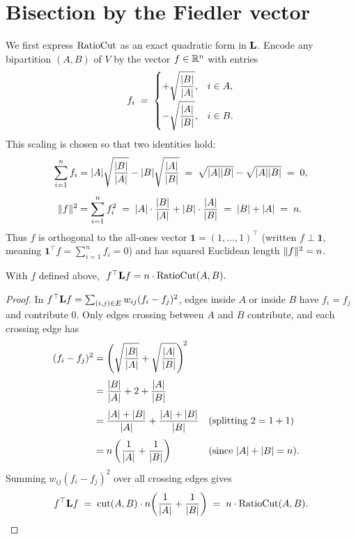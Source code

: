 \section{Bisection by the Fiedler vector}
\label{ch33:fiedler}

We first express $\operatorname{RatioCut}$ as an exact quadratic form in $\mathbf{L}$. Encode any bipartition $(A,B)$ of $V$ by the vector $f \in \mathbb{R}^n$ with entries
\[
  f_i \;=\;
  \begin{cases}
    +\sqrt{\dfrac{\lvert B\rvert}{\lvert A\rvert}}, & i\in A,\\[8pt]
    -\sqrt{\dfrac{\lvert A\rvert}{\lvert B\rvert}}, & i\in B.
  \end{cases}
\]
This scaling is chosen so that two identities hold:
\begin{align*}
  \sum_{i=1}^n f_i &= \lvert A\rvert\sqrt{\frac{\lvert B\rvert}{\lvert A\rvert}} - \lvert B\rvert\sqrt{\frac{\lvert A\rvert}{\lvert B\rvert}} \;=\; \sqrt{\lvert A\rvert\lvert B\rvert} - \sqrt{\lvert A\rvert\lvert B\rvert} \;=\; 0,\\[4pt]
  \lVert f\rVert^2 &= \sum_{i=1}^n f_i^2 \;=\; \lvert A\rvert\cdot\frac{\lvert B\rvert}{\lvert A\rvert} + \lvert B\rvert\cdot\frac{\lvert A\rvert}{\lvert B\rvert} \;=\; \lvert B\rvert + \lvert A\rvert \;=\; n.
\end{align*}
Thus $f$ is orthogonal to the all-ones vector $\mathbf{1} = (1,\dots,1)^\top$ (written $f \perp \mathbf{1}$, meaning $\mathbf{1}^\top f = \sum_{i=1}^n f_i = 0$) and has squared Euclidean length $\lVert f\rVert^2 = n$.

\begin{lemma}
\label{ch33:ratiocut-quad}
With $f$ defined above, $\; f^\top \mathbf{L} f = n\cdot\operatorname{RatioCut}(A,B).$
\end{lemma}

\begin{proof}
In $f^\top\mathbf{L} f=\sum_{(i,j)\in E}w_{ij}(f_i-f_j)^2$, edges inside $A$ or inside $B$ have $f_i = f_j$ and contribute $0$. Only edges crossing between $A$ and $B$ contribute, and each crossing edge has
\begin{align*}
  (f_i - f_j)^2
  &= \left(\sqrt{\frac{\lvert B\rvert}{\lvert A\rvert}} + \sqrt{\frac{\lvert A\rvert}{\lvert B\rvert}}\right)^{\!2}\\[3pt]
  &= \frac{\lvert B\rvert}{\lvert A\rvert} + 2 + \frac{\lvert A\rvert}{\lvert B\rvert}\\[3pt]
  &= \frac{\lvert A\rvert+\lvert B\rvert}{\lvert A\rvert} + \frac{\lvert A\rvert+\lvert B\rvert}{\lvert B\rvert} && \text{(splitting $2 = 1 + 1$)}\\[3pt]
  &= n\left(\frac{1}{\lvert A\rvert}+\frac{1}{\lvert B\rvert}\right) && \text{(since $\lvert A\rvert+\lvert B\rvert=n$).}
\end{align*}
Summing $w_{ij}(f_i - f_j)^2$ over all crossing edges gives
\[
  f^\top\mathbf{L} f \;=\; \operatorname{cut}(A,B)\cdot n\!\left(\frac{1}{\lvert A\rvert}+\frac{1}{\lvert B\rvert}\right) \;=\; n\cdot\operatorname{RatioCut}(A,B).\qedhere
\]
\end{proof}


